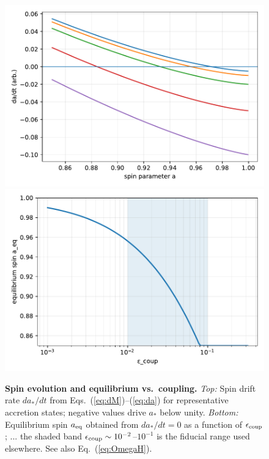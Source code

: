 \documentclass[twocolumn]{aastex701}
\newenvironment{CrowdedFloats}{%
  \begingroup
  \setcounter{topnumber}{1}%
  \setcounter{totalnumber}{2}%
}{\endgroup}
\begin{document}
\begin{CrowdedFloats}
\begin{figure}[!htbp]
  \vspace*{2pt}
  \centering
  \includegraphics[width=.95\linewidth]{Fig3a.pdf}\\[4pt]
  \includegraphics[width=.95\linewidth]{Fig3b.pdf}
  \caption{\textbf{Spin evolution and equilibrium vs.\ coupling.}
  \emph{Top:} Spin drift rate $da_\ast/dt$ from Eqs.~(\ref{eq:dM})--(\ref{eq:da}) for representative accretion states; negative values drive $a_\ast$ below unity.
  \emph{Bottom:} Equilibrium spin $a_{\rm eq}$ obtained from $da_\ast/dt=0$ as a function of $\epsilon_{\rm coup}$; ... the shaded band $\epsilon_{\rm coup}\sim10^{-2}$--$10^{-1}$ is the fiducial range used elsewhere. See also Eq.~(\ref{eq:OmegaH}).}
  \label{fig:fig3}
\end{figure}


\end{CrowdedFloats}
\end{document}
